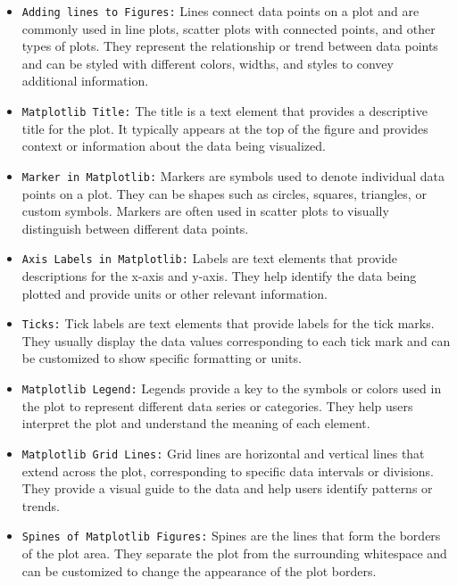 \documentclass[serif, aspectratio=169]{beamer}
\begin{document}
\begin{frame}
    \begin{itemize}
        \item \texttt{\color{red}Adding lines to Figures:} Lines connect data points on a plot and are commonly used in line plots, scatter plots with connected points, and other types of plots. They represent the relationship or trend between data points and can be styled with different colors, widths, and styles to convey additional information.
        \item \texttt{\color{red}Matplotlib Title:} The title is a text element that provides a descriptive title for the plot. It typically appears at the top of the figure and provides context or information about the data being visualized.
        \item \texttt{\color{red}Marker in Matplotlib:} Markers are symbols used to denote individual data points on a plot. They can be shapes such as circles, squares, triangles, or custom symbols. Markers are often used in scatter plots to visually distinguish between different data points.
    \end{itemize}
\end{frame}

\begin{frame}
    \begin{itemize}
        \item \texttt{\color{red}Axis Labels in Matplotlib:} Labels are text elements that provide descriptions for the x-axis and y-axis. They help identify the data being plotted and provide units or other relevant information.
        \item \texttt{\color{red}Ticks:} Tick labels are text elements that provide labels for the tick marks. They usually display the data values corresponding to each tick mark and can be customized to show specific formatting or units.
        \item \texttt{\color{red}Matplotlib Legend:} Legends provide a key to the symbols or colors used in the plot to represent different data series or categories. They help users interpret the plot and understand the meaning of each element.
    \end{itemize}
\end{frame}

\begin{frame}
    \begin{itemize}
        \item \texttt{\color{red}Matplotlib Grid Lines:} Grid lines are horizontal and vertical lines that extend across the plot, corresponding to specific data intervals or divisions. They provide a visual guide to the data and help users identify patterns or trends.
        \item \texttt{\color{red}Spines of Matplotlib Figures:} 
        Spines are the lines that form the borders of the plot area. They separate the plot from the surrounding whitespace and can be customized to change the appearance of the plot borders.
    \end{itemize}
\end{frame}
\end{document}
